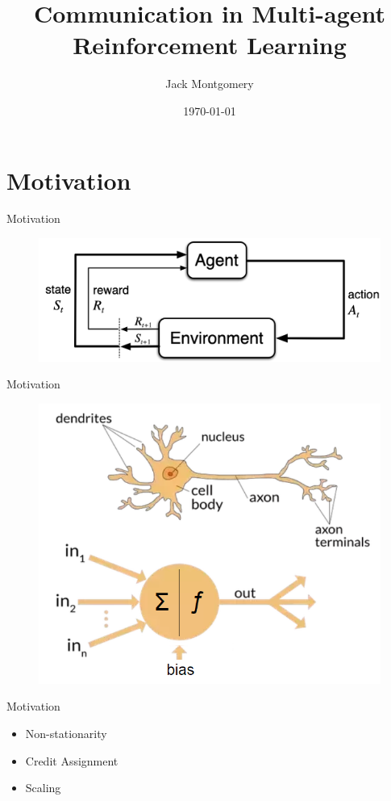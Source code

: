 \documentclass{beamer}
\title{Communication in Multi-agent Reinforcement Learning}
\date{\today}
\author{Jack Montgomery}
\institute{MAM4001W: Advanced Topics in Reinforcement Learning}
\begin{document}
\maketitle

\section{Motivation}
\begin{frame}{Motivation}
\begin{figure}
	\centering
	\includegraphics[scale=0.4]{images/agent_environment.png}
\end{figure}
\end{frame}

\begin{frame}{Motivation}
\begin{figure}
	\centering
	\includegraphics[scale=0.4]{images/neural_networks.png}
\end{figure}
\end{frame}

\begin{frame}{Motivation}
\begin{itemize}
	\item Non-stationarity
	\item Credit Assignment
	\item Scaling
\end{itemize}
\end{frame}
\end{document}
